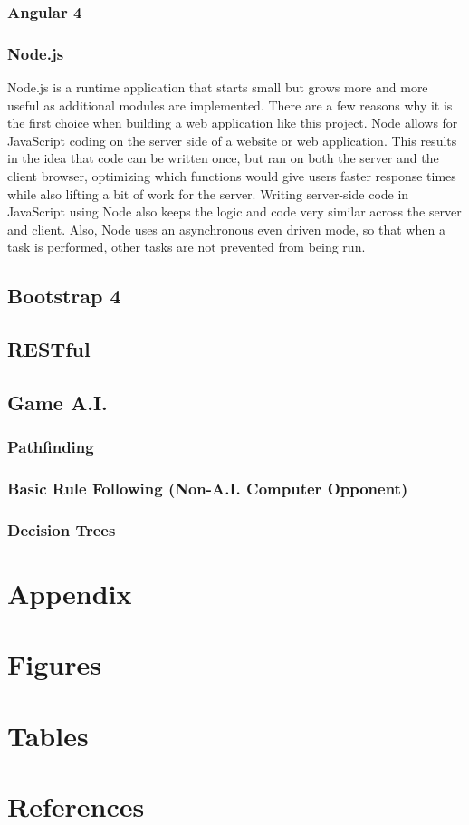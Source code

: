 \documentclass[12pt,a4paper]{report}
\begin{document}
		\subsection{Angular 4}
		\subsection{Node.js}
		Node.js is a runtime application that starts small but grows more and more useful as additional modules are implemented. There are a few reasons why it is the first choice when building a web application like this project. Node allows for JavaScript coding on the server side of a website or web application. This results in the idea that code can be written once, but ran on both the server and the client browser, optimizing which functions would give users faster response times while also lifting a bit of work for the server. Writing server-side code in JavaScript using Node also keeps the logic and code very similar across the server and client. Also, Node uses an asynchronous even driven mode, so that when a task is performed, other tasks are not prevented from being run.
		
	\section{Bootstrap 4}
		
	\section{RESTful}
	\section{Game A.I.}
		\subsection{Pathfinding}
		\subsection{Basic Rule Following (Non-A.I. Computer Opponent)}
		\subsection{Decision Trees}

\newpage
\chapter*{Appendix}

\newpage
\chapter*{Figures}

\newpage
\chapter*{Tables}

\newpage
\chapter*{References}
	
\end{document}

